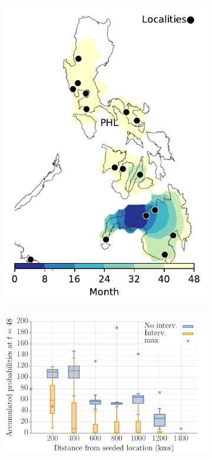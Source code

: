 \documentclass[11pt]{article}
\theoremstyle{definition}
\begin{document}
\begin{figure}[ht]
\begin{subfigure}[b]{.28\textwidth}
\caption{\label{fig:phlBContour}}
\end{subfigure}
\begin{subfigure}[b]{.28\textwidth}
\includegraphics[width=\textwidth]{../cellular_automata/results/contour/PH_model-B_precip1-out-100_m1_l3.pdf}
\caption{\label{fig:phlBContourInt}}
\end{subfigure}
\begin{subfigure}[b]{.43\textwidth}
\includegraphics[width=\textwidth]{../cellular_automata/results/dist_inf_plots/PH_dist_prob_B_box.pdf}

\end{subfigure}
\end{figure}
\end{document}
